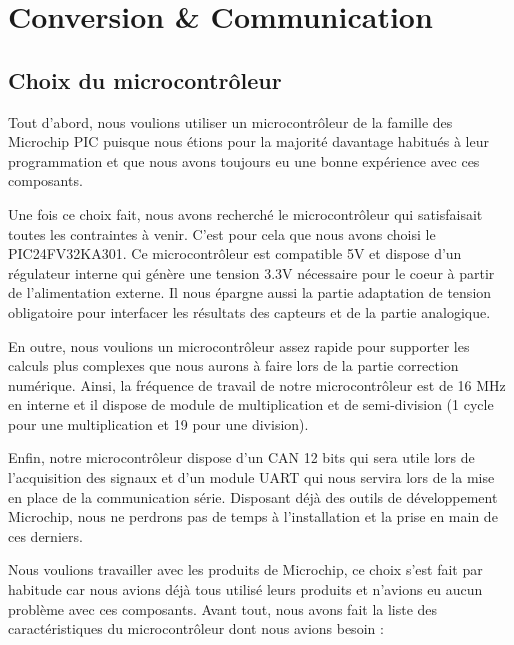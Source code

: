 \documentclass[11pt, french]{article} %
\begin{document}
\section{Conversion \& Communication}
\subsection{Choix du microcontrôleur}

Tout d'abord, nous voulions utiliser un microcontrôleur de la famille des Microchip PIC puisque nous étions pour la majorité davantage habitués à leur programmation et que nous avons toujours eu une bonne expérience avec ces composants. %

\vspace{0.5cm}

Une fois ce choix fait, nous avons recherché le microcontrôleur qui satisfaisait toutes les contraintes à venir. C'est pour cela que nous avons choisi le PIC24FV32KA301. Ce microcontrôleur est compatible 5V et dispose d'un régulateur interne qui génère une tension 3.3V nécessaire pour le coeur à partir de l'alimentation externe. Il nous épargne aussi la partie adaptation de tension obligatoire pour interfacer les résultats des capteurs et de la partie analogique.

\vspace{0.5cm}

En outre, nous voulions un microcontrôleur assez rapide pour supporter les calculs plus complexes que nous aurons à faire lors de la partie correction numérique. Ainsi, la fréquence de travail de notre microcontrôleur est de 16 MHz en interne et il dispose de module de multiplication et de semi-division (1 cycle pour une multiplication et 19 pour une division). 

\vspace{0.5cm}

Enfin, notre microcontrôleur dispose d'un CAN 12 bits qui sera utile lors de l'acquisition des signaux et d'un module UART qui nous servira lors de la mise en place de la communication série. Disposant déjà des outils de développement Microchip, nous ne perdrons pas de temps à l'installation et la prise en main de ces derniers. 

Nous voulions travailler avec les produits de Microchip, ce choix s'est fait par habitude car nous avions déjà tous utilisé leurs produits et n'avions eu aucun problème avec ces composants. Avant tout, nous avons fait la liste des caractéristiques du microcontrôleur dont nous avions besoin :
\end{document}
